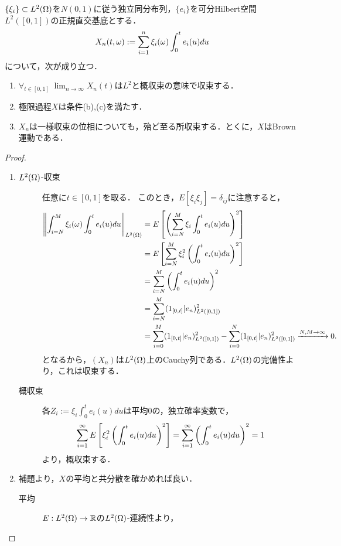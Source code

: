 \documentclass[uplatex,dvipdfmx]{jsarticle}
\begin{document}
\begin{proposition*}
    $\{\xi_i\}\subset L^2(\Omega)$を$N(0,1)$に従う独立同分布列，$\{e_i\}$を可分Hilbert空間$L^2([0,1])$の正規直交基底とする．
    \[X_n(t,\omega):=\sum_{i=1}^n\xi_i(\omega)\int^t_0e_i(u)du\]
    について，次が成り立つ．
    \begin{enumerate}
        \item $\forall_{t\in[0,1]}\;\lim_{n\to\infty}X_n(t)$は$L^2$と概収束の意味で収束する．
        \item 極限過程$X$は条件(b),(c)を満たす．
        \item $X_n$は一様収束の位相についても，殆ど至る所収束する．とくに，$X$はBrown運動である．
    \end{enumerate}
\end{proposition*}
\begin{proof}\mbox{}
    \begin{enumerate}
        \item \begin{description}
            \item[$L^2(\Omega)$-収束] 任意に$t\in[0,1]$を取る．
            このとき，$E[\xi_i\xi_j]=\delta_{ij}$に注意すると，
            \begin{align*}
                \left\|\int^M_{i=N}\xi_i(\omega)\int^t_0e_i(u)du\right\|_{L^2(\Omega)}&=E\left[\left(\sum_{i=N}^M\xi_i\int^t_0e_i(u)du\right)^2\right]\\
                &=E\left[\sum_{i=N}^M\xi_i^2\left(\int^t_0e_i(u)du\right)^2\right]\\
                &=\sum_{i=N}^M\left(\int^t_0e_i(u)du\right)^2\\
                &=\sum_{i=N}^M(1_{[0,t]}|e_n)^2_{L^2([0,1])}\\
                &=\sum^M_{i=0}(1_{[0,t]}|e_n)^2_{L^2([0,1])}-\sum^N_{i=0}(1_{[0,t]}|e_n)^2_{L^2([0,1])}\xrightarrow{N,M\to\infty}0.
            \end{align*}
            となるから，$(X_n)$は$L^2(\Omega)$上のCauchy列である．$L^2(\Omega)$の完備性より，これは収束する．
            \item[概収束] 各$Z_i:=\xi_i\int^t_0e_i(u)du$は平均$0$の，独立確率変数で，
            \[\sum_{i=1}^\infty E\left[\xi^2_i\left(\int^t_0e_i(u)du\right)^2\right]=\sum_{i=1}^\infty\left(\int^t_0e_i(u)du\right)^2=1\]
            より，概収束する．
        \end{description}
        \item 補題より，$X$の平均と共分散を確かめれば良い．
        \begin{description}
            \item[平均] $E:L^2(\Omega)\to\mathbb{R}$の$L^2(\Omega)$-連続性より，

\end{description}
\end{enumerate}
\end{proof}
\end{document}
